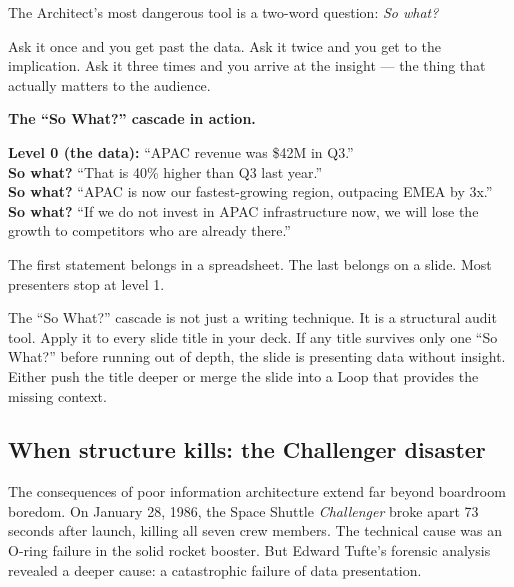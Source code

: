 The Architect's most dangerous tool is a two-word question: \emph{So what?}

Ask it once and you get past the data. Ask it twice and you get to the implication. Ask it three times and you arrive at the insight --- the thing that actually matters to the audience.

\begin{diagnosisbox}
\textbf{The ``So What?'' cascade in action.}

\vspace{6pt}
\textbf{Level 0 (the data):} ``APAC revenue was \$42M in Q3.''\\
\textbf{So what?} ``That is 40\% higher than Q3 last year.''\\
\textbf{So what?} ``APAC is now our fastest-growing region, outpacing EMEA by 3x.''\\
\textbf{So what?} ``If we do not invest in APAC infrastructure now, we will lose the growth to competitors who are already there.''

\vspace{6pt}
The first statement belongs in a spreadsheet. The last belongs on a slide. Most presenters stop at level 1.
\end{diagnosisbox}

The ``So What?'' cascade is not just a writing technique. It is a structural audit tool. Apply it to every slide title in your deck. If any title survives only one ``So What?'' before running out of depth, the slide is presenting data without insight. Either push the title deeper or merge the slide into a Loop that provides the missing context.


\subsection{When structure kills: the Challenger disaster}

The consequences of poor information architecture extend far beyond boardroom boredom. On January 28, 1986, the Space Shuttle \emph{Challenger} broke apart 73 seconds after launch, killing all seven crew members. The technical cause was an O-ring failure in the solid rocket booster. But Edward Tufte's forensic analysis revealed a deeper cause: a catastrophic failure of data presentation.

